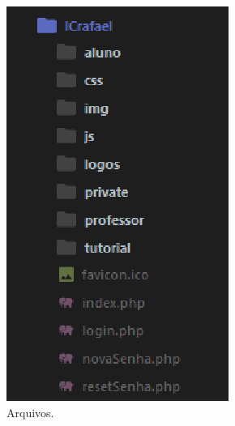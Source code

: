 \documentclass[
	12pt,				%
	openany,
	oneside,
	a4paper,			%
	english,			%
	brazil				%
	]{abntex2}
\begin{document}


\begin{figure}
  \vspace{-0.5cm}
  \centering
  \includegraphics[scale=0.6]{filesSublime.png}
  \caption{Arquivos.}
  \label{fig:files}
  \vspace{-2cm}
\end{figure}
    
\end{document}
